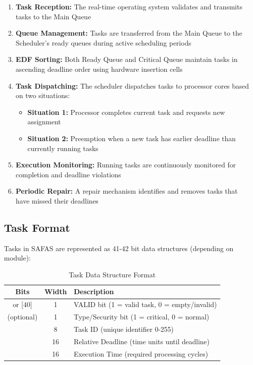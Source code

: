 \documentclass[12pt,a4paper]{article}
\begin{document}
\begin{enumerate}
    \item \textbf{Task Reception:} The real-time operating system validates and transmits tasks to the Main Queue
    \item \textbf{Queue Management:} Tasks are transferred from the Main Queue to the Scheduler's ready queues during active scheduling periods
    \item \textbf{EDF Sorting:} Both Ready Queue and Critical Queue maintain tasks in ascending deadline order using hardware insertion cells
    \item \textbf{Task Dispatching:} The scheduler dispatches tasks to processor cores based on two situations:
    \begin{itemize}
        \item \textbf{Situation 1:} Processor completes current task and requests new assignment
        \item \textbf{Situation 2:} Preemption when a new task has earlier deadline than currently running tasks
    \end{itemize}
    \item \textbf{Execution Monitoring:} Running tasks are continuously monitored for completion and deadline violations
    \item \textbf{Periodic Repair:} A repair mechanism identifies and removes tasks that have missed their deadlines
\end{enumerate}

\subsection{Task Format}

Tasks in SAFAS are represented as 41-42 bit data structures (depending on module):

\begin{table}[H]
\centering
\begin{tabular}{|c|c|l|}
\hline
\textbf{Bits} & \textbf{Width} & \textbf{Description} \\
\hline
[41] or [40] & 1 & VALID bit (1 = valid task, 0 = empty/invalid) \\
[40] (optional) & 1 & Type/Security bit (1 = critical, 0 = normal) \\
[39:32] & 8 & Task ID (unique identifier 0-255) \\
[31:16] & 16 & Relative Deadline (time units until deadline) \\
[15:0] & 16 & Execution Time (required processing cycles) \\
\hline
\end{tabular}
\caption{Task Data Structure Format}
\label{tab:task_format}
\end{table}
\end{document}
